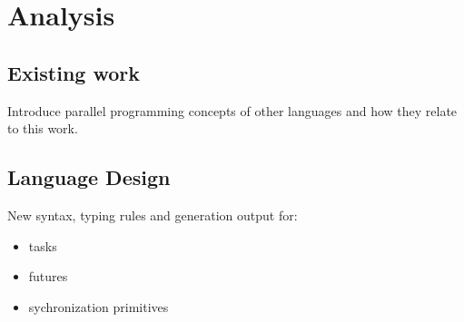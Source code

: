 \chapter{Analysis}

\section{Existing work}
Introduce parallel programming concepts of other languages and how they relate to this work.

\section{Language Design}
New syntax, typing rules and generation output for:
\begin{itemize}
\item tasks
\item futures
\item sychronization primitives
\end{itemize}

